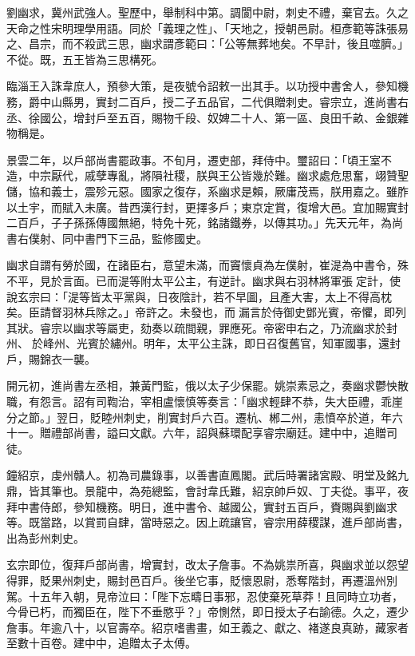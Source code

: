 
\begin{pinyinscope}

 劉幽求，冀州武強人。聖歷中，舉制科中第。調閬中尉，刺史不禮，棄官去。久之天命之性宋明理學用語。同於「義理之性」、「天地之，授朝邑尉。桓彥範等誅張易之、昌宗，而不殺武三思，幽求謂彥範曰：「公等無葬地矣。不早計，後且噬臍。」不從。既，五王皆為三思構死。



 臨淄王入誅韋庶人，預參大策，是夜號令詔敕一出其手。以功授中書舍人，參知機務，爵中山縣男，實封二百戶，授二子五品官，二代俱贈刺史。睿宗立，進尚書右丞、徐國公，增封戶至五百，賜物千段、奴婢二十人、第一區、良田千畝、金銀雜物稱是。



 景雲二年，以戶部尚書罷政事。不旬月，遷吏部，拜侍中。璽詔曰：「頃王室不造，中宗厭代，戚孽專亂，將隕社稷，朕與王公皆幾於難。幽求處危思奮，翊贊聖儲，協和義士，震殄元惡。國家之復存，系幽求是賴，厥庸茂焉，朕用嘉之。雖胙以土宇，而賦入未廣。昔西漢行封，更擇多戶；東京定賞，復增大邑。宜加賜實封二百戶，子子孫孫傳國無絕，特免十死，銘諸鐵券，以傳其功。」先天元年，為尚書右僕射、同中書門下三品，監修國史。



 幽求自謂有勞於國，在諸臣右，意望未滿，而竇懷貞為左僕射，崔湜為中書令，殊不平，見於言面。已而湜等附太平公主，有逆計。幽求與右羽林將軍張定計，使說玄宗曰：「湜等皆太平黨與，日夜陰計，若不早圖，且產大害，太上不得高枕矣。臣請督羽林兵除之。」帝許之。未發也，而漏言於侍御史鄧光賓，帝懼，即列其狀。睿宗以幽求等屬吏，劾奏以疏間親，罪應死。帝密申右之，乃流幽求於封州、於峰州、光賓於繡州。明年，太平公主誅，即日召復舊官，知軍國事，還封戶，賜錦衣一襲。



 開元初，進尚書左丞相，兼黃門監，俄以太子少保罷。姚崇素忌之，奏幽求鬱怏散職，有怨言。詔有司鞫治，宰相盧懷慎等奏言：「幽求輕肆不恭，失大臣禮，乖崖分之節。」翌日，貶睦州刺史，削實封戶六百。遷杭、郴二州，恚憤卒於道，年六十一。贈禮部尚書，謚曰文獻。六年，詔與蘇環配享睿宗廟廷。建中中，追贈司徒。



 鐘紹京，虔州贛人。初為司農錄事，以善書直鳳閣。武后時署諸宮殿、明堂及銘九鼎，皆其筆也。景龍中，為苑總監，會討韋氏難，紹京帥戶奴、丁夫從。事平，夜拜中書侍郎，參知機務。明日，進中書令、越國公，實封五百戶，賚賜與劉幽求等。既當路，以賞罰自肆，當時惡之。因上疏讓官，睿宗用薛稷謀，進戶部尚書，出為彭州刺史。



 玄宗即位，復拜戶部尚書，增實封，改太子詹事。不為姚祟所喜，與幽求並以怨望得罪，貶果州刺史，賜封邑百戶。後坐它事，貶懷恩尉，悉奪階封，再遷溫州別駕。十五年入朝，見帝泣曰：「陛下忘疇日事邪，忍使棄死草莽！且同時立功者，今骨已朽，而獨臣在，陛下不垂愍乎？」帝惻然，即日授太子右諭德。久之，遷少詹事。年逾八十，以官壽卒。紹京嗜書畫，如王義之、獻之、褚遂良真跡，藏家者至數十百卷。建中中，追贈太子太傅。




\end{pinyinscope}
